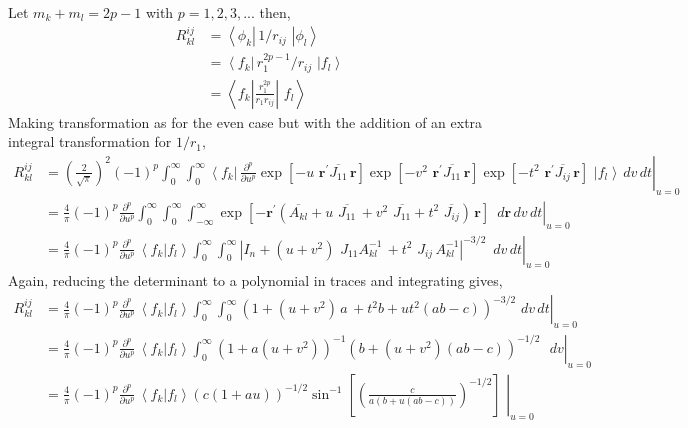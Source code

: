 \documentclass[12pt]{article}
\begin{document}
Let $m_{k}+m_{l}=2p-1$ with $p=1,2,3,...$ then,
\begin{align}
R_{kl}^{ij}  & =\left\langle \phi_{k}\right|  \,1/r_{ij}\,\mathbf{\,}\left|
\phi_{l}\right\rangle \\
& =\left\langle f_{k}\right|  \,r_{1}^{2p-1}/r_{ij}\,\mathbf{\,}\left|
f_{l}\right\rangle \\
& =\left\langle f_{k}\left|  \frac{r_{1}^{2p}}{r_{1}r_{ij}}\right|
\,\mathbf{\,}f_{l}\right\rangle
\end{align}
Making transformation as for the even case but with the addition of an extra
integral transformation for $1/r_{1},$%
\begin{align}
R_{kl}^{ij}  & =\left.  \left(  \frac{2}{\sqrt{\pi}}\right)  ^{2}\left(
-1\right)  ^{p}\int_{0}^{\infty}\int_{0}^{\infty}\left\langle f_{k}\right|
\,\frac{\partial^{p}}{\partial u^{p}}\exp\left[  -u\,\,\mathbf{r}^{\prime
}\overline{J_{11}}\,\mathbf{r}\right]  \exp\left[  -v^{2}\,\,\mathbf{r}%
^{\prime}\overline{J_{11}}\,\mathbf{r}\right]  \exp\left[  -t^{2}%
\,\,\mathbf{r}^{\prime}\overline{J_{ij}}\,\mathbf{r}\right]  \,\mathbf{\,}%
\left|  f_{l}\right\rangle \,dv\,dt\right|  _{u=0}\\
& =\left.  \frac{4}{\pi}\left(  -1\right)  ^{p}\frac{\partial^{p}}{\partial
u^{p}}\int_{0}^{\infty}\int_{0}^{\infty}\int_{-\infty}^{\infty}\exp\left[
-\mathbf{r}^{\prime}\left(  \overline{A_{kl}}+u\,\,\overline{J_{11}}%
\,+v^{2}\,\,\overline{J_{11}}+t^{2}\,\,\overline{J_{ij}}\right)
\,\mathbf{r}\right]  \,\mathbf{\,}\,d\mathbf{r}\,dv\,dt\right|  _{u=0}\\
& =\left.  \frac{4}{\pi}\left(  -1\right)  ^{p}\frac{\partial^{p}}{\partial
u^{p}}\,\left\langle f_{k}\right.  |\left.  f_{l}\right\rangle \int
_{0}^{\infty}\int_{0}^{\infty}\left|  I_{n}+\left(  u+v^{2}\right)
\,\,J_{11}A_{kl}^{-1}\,+t^{2}\,\,J_{ij}\,A_{kl}^{-1}\right|  ^{-3/2}%
\mathbf{\,}\,\,dv\,dt\right|  _{u=0}%
\end{align}
Again, reducing the determinant to a polynomial in traces and integrating
gives,
\begin{align}
R_{kl}^{ij}  & =\left.  \frac{4}{\pi}\left(  -1\right)  ^{p}\frac{\partial
^{p}}{\partial u^{p}}\,\left\langle f_{k}\right.  |\left.  f_{l}\right\rangle
\int_{0}^{\infty}\int_{0}^{\infty}\left(  1+\left(  u+v^{2}\right)
\,a\,+t^{2}b+ut^{2}\left(  ab-c\right)  \right)  ^{-3/2}\mathbf{\,}%
\,dv\,dt\right|  _{u=0}\\
& =\left.  \frac{4}{\pi}\left(  -1\right)  ^{p}\frac{\partial^{p}}{\partial
u^{p}}\,\left\langle f_{k}\right.  |\left.  f_{l}\right\rangle \int
_{0}^{\infty}\left(  1+a\left(  u+v^{2}\right)  \right)  ^{-1}\left(
b+\left(  u+v^{2}\right)  \left(  ab-c\right)  \right)  ^{-1/2}\mathbf{\,}%
\,\,\,dv\right|  _{u=0}\\
& =\left.  \frac{4}{\pi}\left(  -1\right)  ^{p}\frac{\partial^{p}}{\partial
u^{p}}\,\left\langle f_{k}\right.  |\left.  f_{l}\right\rangle \left(
c\left(  1+au\right)  \right)  ^{-1/2}\sin^{-1}\left[  \left(  \frac
{c}{a\left(  b+u\left(  ab-c\right)  \right)  }\right)  ^{-1/2}\right]
\mathbf{\,}\,\right|  _{u=0}%
\end{align}
\end{document}
